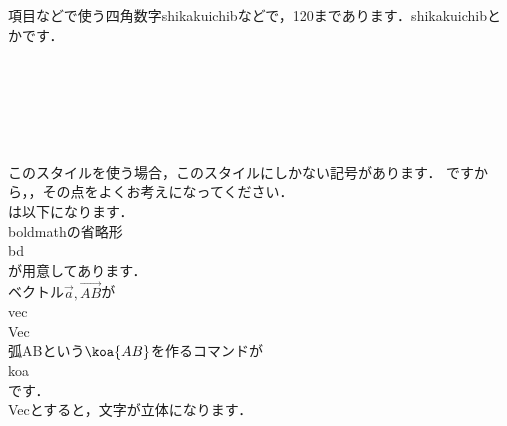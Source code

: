 \documentclass [10pt,fleqn,b5paper]{jsarticlek}
\begin{document}
項目などで使う四角数字shikakuichibなどで，120まであります．\yy shikakuichibとかです．\\
\shikakuichib
\shikakunib
\shikakusanb
\shikakushib
\shikakugob
\shikakurokub
\shikakushichib
\shikakuhachib
\shikakukyub
\shikakujyub
\shikakujyuichib
\shikakujyunib
\shikakujyusanb
\shikakujyushib
\shikakujyugob
\shikakujyurokub
\shikakujyushichib
\shikakujyuhachib
\shikakujyukyub
\shikakunijyub\\
\shikakunijyuichib
\shikakunijyunib
\shikakunijyusanb
\shikakunijyushib
\shikakunijyugob
\shikakunijyurokub
\shikakunijyushichib
\shikakunijyuhachib
\shikakunijyukub
\shikakusanjyub
\shikakusanjyuichib
\shikakusanjyunib
\shikakusanjyusanb
\shikakusanjyushib
\shikakusanjyugob
\shikakusanjyurokub
\shikakusanjyushichib
\shikakusanjyuhachib
\shikakusanjyukyub
\shikakuyonjyub\\
\shikakuyonjyuichib
\shikakuyonjyunib
\shikakuyonjyusanb
\shikakuyonjyushib
\shikakuyonjyugob
\shikakuyonjyurokub
\shikakuyonjyushichib
\shikakuyonjyuhachib
\shikakuyonjyukyub
\shikakugojyub
\shikakugojyuichib
\shikakugojyunib
\shikakugojyusanb
\shikakugojyushib
\shikakugojyugob
\shikakugojyurokub
\shikakugojyushichib
\shikakugojyuhachib
\shikakugojyukyub
\shikakurokujyub\\
\shikakurokujyuichib
\shikakurokujyunib
\shikakurokujyusanb
\shikakurokujyushib
\shikakurokujyugob
\shikakurokujyurokub
\shikakurokujyushichib
\shikakurokujyuhachib
\shikakurokujyukyub
\shikakunanajyub\\
\\
\\
このスタイルを使う場合，このスタイルにしかない記号があります．
ですから，，その点をよくお考えになってください．\\
\;\;は以下になります．\\
\;\;boldmathの省略形\\
\dd \yy bd\bl \br \dd \\
が用意してあります．\\
\;\;ベクトル$\vec{a},\Vec{AB}$が\\
\dd \yy vec\bl \br \dd \\
\dd \yy Vec\bl \br \dd \\
\;\;弧ABという$\koa{AB}$を作るコマンドが\\
\dd \yy koa\bl \br \dd \\
です．\\
Vecとすると，文字が立体になります．
\end{document}
